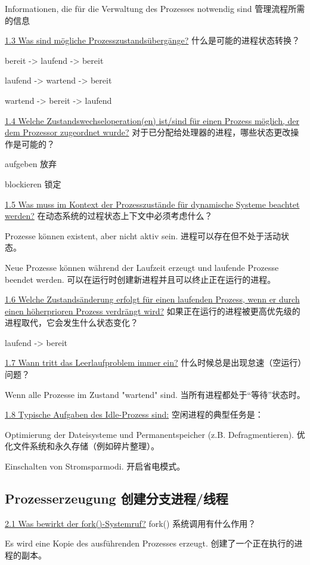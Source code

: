 \documentclass[fleqn]{article}
\begin{document}
Informationen, die für die Verwaltung des Prozesses notwendig sind
管理流程所需的信息

\noindent\uline{1.3 Was sind mögliche Prozesszustandsübergänge?}
什么是可能的进程状态转换？

bereit -> laufend -> bereit

laufend -> wartend -> bereit

wartend -> bereit -> laufend

\noindent\uline{1.4 Welche Zustandswechseloperation(en) ist/sind für einen Prozess möglich, der dem Prozessor zugeordnet wurde?}
对于已分配给处理器的进程，哪些状态更改操作是可能的？

aufgeben 放弃

blockieren 锁定

\noindent\uline{1.5 Was muss im Kontext der Prozesszustände für dynamische Systeme beachtet werden?}
在动态系统的过程状态上下文中必须考虑什么？

Prozesse können existent, aber nicht aktiv sein.
进程可以存在但不处于活动状态。

Neue Prozesse können während der Laufzeit erzeugt und laufende Prozesse beendet werden.
可以在运行时创建新进程并且可以终止正在运行的进程。

\noindent\uline{1.6 Welche Zustandsänderung erfolgt für einen laufenden Prozess, wenn er durch einen höherprioren Prozess verdrängt wird?}
如果正在运行的进程被更高优先级的进程取代，它会发生什么状态变化？

laufend -> bereit

\noindent\uline{1.7 Wann tritt das Leerlaufproblem immer ein?}
什么时候总是出现怠速（空运行）问题？

Wenn alle Prozesse im Zustand "wartend" sind.
当所有进程都处于“等待”状态时。

\noindent\uline{1.8 Typische Aufgaben des Idle-Prozess sind:}
空闲进程的典型任务是：

Optimierung der Dateisysteme und Permanentspeicher (z.B. Defragmentieren).
优化文件系统和永久存储（例如碎片整理）。
	
Einschalten von Stromsparmodi.
开启省电模式。


\subsection{Prozesserzeugung 创建分支进程/线程}

\noindent\uline{2.1 Was bewirkt der fork()-Systemruf?}
fork() 系统调用有什么作用？

Es wird eine Kopie des ausführenden Prozesses erzeugt.
创建了一个正在执行的进程的副本。
\end{document}
